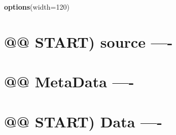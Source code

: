 \documentclass[
]{article}
\newenvironment{Shaded}{\begin{snugshade}}{\end{snugshade}}
\newcommand{\AttributeTok}[1]{\textcolor[rgb]{0.13,0.29,0.53}{#1}}
\newcommand{\DecValTok}[1]{\textcolor[rgb]{0.00,0.00,0.81}{#1}}
\newcommand{\FunctionTok}[1]{\textcolor[rgb]{0.13,0.29,0.53}{\textbf{#1}}}
\newcommand{\NormalTok}[1]{#1}
\begin{document}
\begin{Shaded}
\begin{Highlighting}[]
\FunctionTok{options}\NormalTok{(}\AttributeTok{width=}\DecValTok{120}\NormalTok{)}
\end{Highlighting}
\end{Shaded}

\hypertarget{start-source--}{%
\section{@@ START) source ----}\label{start-source--}}

\hypertarget{metadata--}{%
\section{@@ MetaData ----}\label{metadata--}}

\hypertarget{start-data--}{%
\section{@@ START) Data ----}\label{start-data--}}
\end{document}
